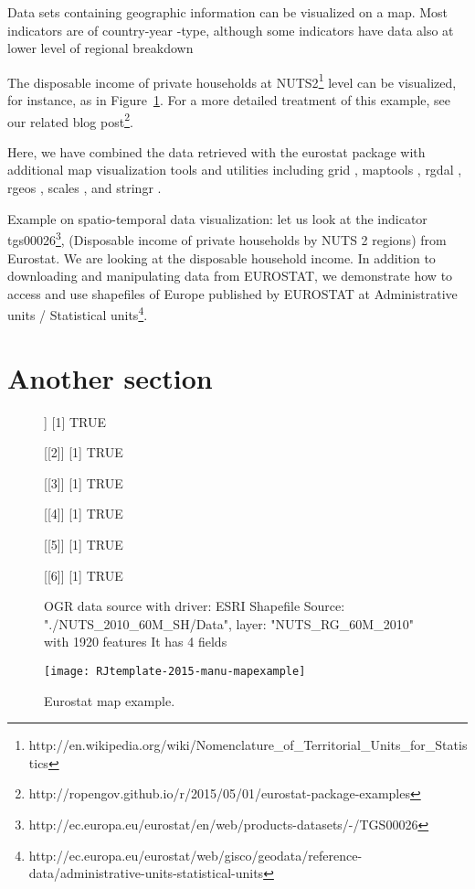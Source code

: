 Data sets containing geographic information can be visualized on a
map. Most indicators are of country-year -type, although some
indicators have data also at lower level of regional breakdown

The disposable income of private households at
NUTS2\footnote{http://en.wikipedia.org/wiki/Nomenclature\_of\_Territorial\_Units\_for\_Statistics}
level can be visualized, for instance, as in
Figure~\ref{fig:mapexample}. For a more detailed treatment of this
example, see our related blog
post\footnote{http://ropengov.github.io/r/2015/05/01/eurostat-package-examples}.


Here, we have combined the data retrieved with the eurostat package
with additional map visualization tools and utilities including
grid \citep{grid}, maptools \citep{maptools}, rgdal \citep{rgdal},
rgeos \citep{rgeos}, scales \citep{scales}, and
stringr \citep{stringr}.

Example on spatio-temporal data visualization: let us look at the indicator tgs00026\footnote{http://ec.europa.eu/eurostat/en/web/products-datasets/-/TGS00026}, (Disposable income of private households by NUTS 2 regions) from Eurostat. We are looking at the disposable household income. In addition to downloading and manipulating data from EUROSTAT, we demonstrate how to access and use shapefiles of Europe published by EUROSTAT at Administrative units / Statistical units\footnote{http://ec.europa.eu/eurostat/web/gisco/geodata/reference-data/administrative-units-statistical-units}.



\section{Another section}

\begin{figure}
\begin{Schunk}
\begin{Soutput}
[[1]]
[1] TRUE

[[2]]
[1] TRUE

[[3]]
[1] TRUE

[[4]]
[1] TRUE

[[5]]
[1] TRUE

[[6]]
[1] TRUE
\end{Soutput}
\begin{Soutput}
OGR data source with driver: ESRI Shapefile 
Source: "./NUTS_2010_60M_SH/Data", layer: "NUTS_RG_60M_2010"
with 1920 features
It has 4 fields
\end{Soutput}
\end{Schunk}
\texttt{[image: RJtemplate-2015-manu-mapexample]}
\label{fig:mapexample}
\caption{Eurostat map example.}
\end{figure}


